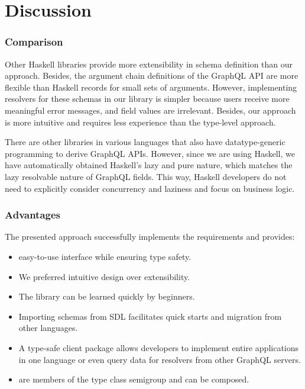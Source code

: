 \section{Discussion}


\begin{frame}\frametitle{Comparison}

    Other Haskell libraries provide more extensibility in schema definition than our approach. Besides, the argument chain definitions of the GraphQL API are more flexible than Haskell records for small sets of arguments. However, implementing resolvers for these schemas in our library is simpler because users receive more meaningful error messages, and field values are irrelevant. Besides, our approach is more intuitive and requires less experience than the type-level approach.
    
    There are other libraries in various languages that also have datatype-generic programming to derive GraphQL APIs. However, since we are using Haskell, we have automatically obtained Haskell's lazy and pure nature, which matches the lazy resolvable nature of GraphQL fields. This way, Haskell developers do not need to explicitly consider concurrency and laziness and focus on business logic. 
\end{frame}
    
\begin{frame}\frametitle{Advantages}

The presented approach successfully implements the requirements and provides:

\begin{itemize}
    \item easy-to-use interface while ensuring type safety.
    \item We preferred intuitive design over extensibility.
    \item The library can be learned quickly by beginners.
    \item Importing schemas from SDL facilitates quick starts and migration from other languages.
    \item A type-safe client package allows developers to implement entire applications in one language or even query data for resolvers from other GraphQL servers.
    \item {} are members of the type class semigroup and can be composed.
\end{itemize}

\end{frame}

